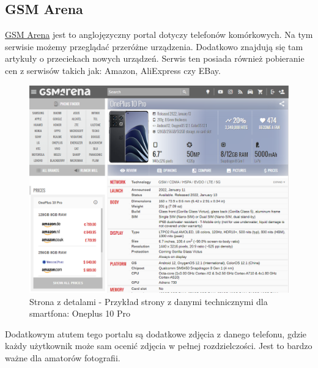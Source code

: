 \subsection{GSM Arena}
\href{https://www.gsmarena.com/}{GSM Arena} \cite{gsm_arena} jest to anglojęzyczny portal dotyczy telefonów komórkowych. Na tym serwisie możemy przeglądać przeróżne urządzenia. Dodatkowo znajdują się tam artykuły o przeciekach nowych urządzeń. Serwis ten posiada również pobieranie cen z serwisów takich jak: Amazon, AliExpress czy EBay.
\begin{figure}[H]
    \includegraphics[width=15cm]{img/GSM Arena/DetailsPageWithPrices.png}
    \caption{Strona z detalami - Przykład strony z danymi technicznymi dla smartfona: Oneplus 10 Pro}
    \label{GSM_Arena_1}
\end{figure}
Dodatkowym atutem tego portalu są dodatkowe zdjęcia z danego telefonu, gdzie każdy użytkownik może sam ocenić zdjęcia w pełnej rozdzielczości. Jest to bardzo ważne dla amatorów fotografii.
